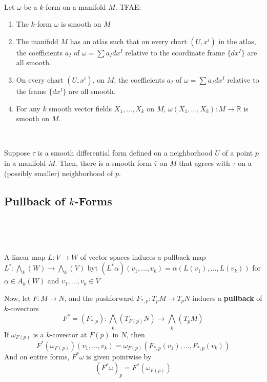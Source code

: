 \documentclass{article}
\begin{document}
\begin{proposition}
  \

  Let $\omega$ be a $k$-form on a manifold $M$. TFAE:

  \begin{enumerate}
    \item The $k$-form $\omega$ is smooth on $M$
    \item The manifold $M$ has an atlas such that on every chart $(U, x^i)$ in the atlas, the coefficients $a_I$ of $\omega = \sum a_Idx^I$ relative to the coordinate frame $\{dx^I\}$ are all smooth.
    \item On every chart $(U, x^i)$, on $M$, the coefficients $a_I$ of $\omega = \sum a_Idx^I$ relative to the frame $\{dx^I\}$ are all smooth.
    \item For any $k$ smooth vector fields $X_1, \dots, X_k$ on $M$, $\omega(X_1, \dots, X_k): M \to \mathbb{R}$ is smooth on $M$.
  \end{enumerate}
\end{proposition}

\begin{proposition}
  \

  Suppose $\tau$ is a smooth differential form defined on a neighborhood $U$ of a point $p$ in a manifold $M$. Then, there is a smooth form $\bar{\tau}$ on $M$ that agrees with $\tau$ on a (possibly smaller) neighborhood of $p$.
\end{proposition}

\subsection{Pullback of $k$-Forms}
\

\begin{definition}
  \

  A linear map $L: V \to W$ of vector spaces induces a pullback map $L^*: \bigwedge_k(W) \to \bigwedge_k(V)$ byt $(L^*\alpha)(v_1, \dots, v_k) = \alpha(L(v_1),\dots, L(v_k))$ for $\alpha \in A_k(W)$ and $v_1, \dots, v_k\in V$

  Now, let $F: M \to N$, and the pushforward $F_{*,p}: T_pM \to T_pN$ induces a \textbf{pullback} of $k$-covectors $$F^* = (F_{*,p}): \bigwedge_k(T_{F(p)}N) \to \bigwedge_k(T_pM)$$If $\omega_{F(p)}$ is a $k$-covector at $F(p)$ in $N$, then $$F^*(\omega_{F(p)})(v_1, \dots, v_k) = \omega_{F(p)}(F_{*,p}(v_1), \dots, F_{*,p}(v_k))$$And on entire forms, $F^*\omega$ is given pointwise by $$(F^*\omega)_p = F^*(\omega_{F(p)})$$
\end{definition}
\end{document}
